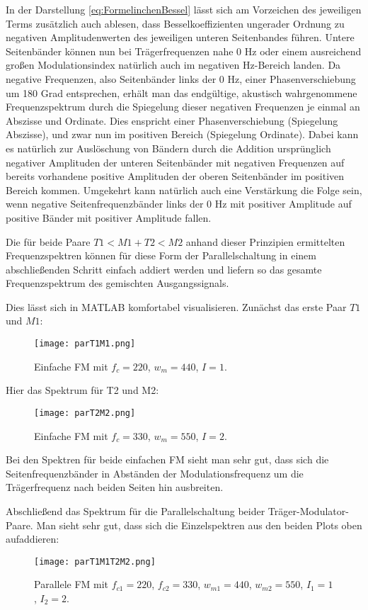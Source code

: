 In der Darstellung \ref{eq:FormelinchenBessel} lässt sich am Vorzeichen des jeweiligen Terms zusätzlich auch ablesen, dass Besselkoeffizienten ungerader Ordnung zu negativen Amplitudenwerten des jeweiligen unteren Seitenbandes führen. Untere Seitenbänder können nun bei Trägerfrequenzen nahe 0 Hz oder einem ausreichend großen Modulationsindex natürlich auch im negativen Hz-Bereich landen. Da negative Frequenzen, also Seitenbänder links der 0 Hz, einer Phasenverschiebung um 180 Grad entsprechen, erhält man das endgültige, akustisch wahrgenommene Frequenzspektrum durch die Spiegelung dieser negativen Frequenzen je einmal an Abszisse und Ordinate. Dies enspricht einer Phasenverschiebung (Spiegelung Abszisse), und zwar nun im positiven Bereich (Spiegelung Ordinate). Dabei kann es natürlich zur Auslöschung von Bändern durch die Addition ursprünglich negativer Amplituden der unteren Seitenbänder mit negativen Frequenzen auf bereits vorhandene positive Amplituden der oberen Seitenbänder im positiven Bereich kommen. Umgekehrt kann natürlich auch eine Verstärkung die Folge sein, wenn negative Seitenfrequenzbänder links der 0 Hz mit positiver Amplitude auf positive Bänder mit positiver Amplitude fallen.

Die für beide Paare $T1<M1 + T2<M2$ anhand dieser Prinzipien ermittelten Frequenzspektren können für diese Form der Parallelschaltung in einem abschließenden Schritt einfach addiert werden und liefern so das gesamte Frequenzspektrum des gemischten Ausgangssignals. 

Dies lässt sich in MATLAB komfortabel visualisieren. Zunächst das erste Paar $T1$ und $M1$:
\FloatBarrier
\begin{figure} [ht]
\centering
  \texttt{[image: parT1M1.png]}
\caption{Einfache FM mit $f_c = 220$, $w_m = 440$, $I = 1$. }
\end{figure}
\FloatBarrier
Hier das Spektrum für T2 und M2:
\FloatBarrier
\begin{figure} [ht]
\centering
  \texttt{[image: parT2M2.png]}
\caption{Einfache FM mit $f_c = 330$, $w_m = 550$, $I = 2$. }
\end{figure}
\FloatBarrier
Bei den Spektren für beide einfachen FM sieht man sehr gut, dass sich die Seitenfrequenzbänder in Abständen der Modulationsfrequenz um die Trägerfrequenz nach beiden Seiten hin ausbreiten.

Abschließend das Spektrum für die Parallelschaltung beider Träger-Modulator-Paare. Man sieht sehr gut, dass sich die Einzelspektren aus den beiden Plots oben aufaddieren: 
\FloatBarrier
\begin{figure} [ht]
\centering
  \texttt{[image: parT1M1T2M2.png]}
\caption{Parallele FM mit $f_{c1} = 220$, $f_{c2} = 330$, $w_{m1} = 440$, $w_{m2} = 550$, $I_1 = 1$, $I_2 = 2$. }
\end{figure}
\FloatBarrier


